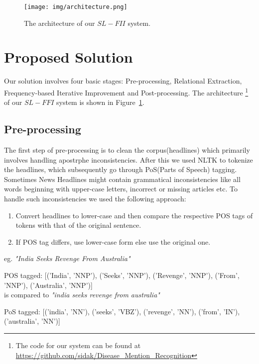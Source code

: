 \documentclass{article}
\begin{document}
\begin{figure}[t]
\centering
\texttt{[image: img/architecture.png]}
\caption{The architecture of our $SL-FII$ system.}
\label{fig:architecture}
\end{figure}


\section{Proposed Solution}

Our solution involves four basic stages: Pre-processing, Relational Extraction, Frequency-based Iterative Improvement and Post-processing. The architecture \footnote{The code for our system can be found at \\ \url{https://github.com/sidak/Disease_Mention_Recognition}} of our $SL-FFI$ system is shown in Figure~\ref{fig:architecture}. 

\subsection{Pre-processing}

The first step of pre-processing is to clean the corpus(headlines) which primarily involves handling apostrphe inconsistencies. After this we used NLTK to tokenize the headlines, which subsequently go through PoS(Parts of Speech) tagging. Sometimes News Headlines might contain grammatical inconsistencies like all words beginning with upper-case letters, incorrect or missing articles etc.  To handle such inconsistencies we used the following approach:
\begin{enumerate}

\item Convert headlines to lower-case and then compare the respective POS tags of tokens with that of the original sentence.

\item If POS tag differs, use lower-case form else use the original one.
\end{enumerate}

eg. \textit{"India Seeks Revenge From Australia"}

POS tagged: [('India', 'NNP'), ('Seeks', 'NNP'), ('Revenge', 'NNP'), ('From', 'NNP'), ('Australia', 'NNP')]\\

is compared to \textit{"india seeks revenge from australia"}

PoS tagged: [('india', 'NN'), ('seeks', 'VBZ'), ('revenge', 'NN'), ('from', 'IN'), ('australia', 'NN')]\\
\end{document}
